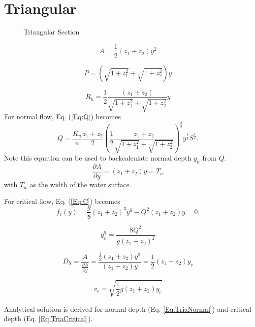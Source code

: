 \section{Triangular}

\begin{figure}[h]
\centering
{}
\caption{Triangular Section}
\end{figure}

\begin{equation}
A = \frac{1}{2} (z_1 + z_2) y^2
\end{equation}

\begin{equation}
P = \left(\sqrt{1+z_1^2} + \sqrt{1+z_2^2}\right)y
\end{equation}

\begin{equation}
R_h = \frac{1}{2}\frac{(z_1 + z_2) }{\sqrt{1+z_1^2} + \sqrt{1+z_2^2}}y
\end{equation}
For normal flow, Eq. (\ref{Eq:Q}) becomes
\begin{equation}
Q = \frac{K_u}{n} \frac{z_1 + z_2}{2}  \left(\frac{1}{2}\frac{z_1 + z_2}{\sqrt{1+z_1^2} + \sqrt{1+z_2^2}}\right)^{\frac{2}{3}} y^{\frac{8}{3}}S^{\frac{1}{2}}.
\label{Eq:TriaNormal}
\end{equation}
Note this equation can be used to backcalculate normal depth $y_n$ from $Q$.
\begin{equation}
\frac{\partial A}{\partial y} = (z_1 + z_2)y = T_w
\end{equation}
with $T_w$ as the width of the water surface.

\noindent For critical flow, Eq. (\ref{Eq:C}) becomes
\begin{equation}  
f_c(y)= \frac{g}{8}(z_1 + z_2)^3y^6 - Q^2(z_1 + z_2)y = 0.
\end{equation}

\begin{equation}  
y_c^5 = \frac{8Q^2}{g(z_1 + z_2)^2}
\label{Eq:TriaCritical}
\end{equation}

\begin{equation}  
D_h = \frac{A}{\frac{\partial A}{\partial y}} = \frac{\frac{1}{2} (z_1 + z_2) y^2}{(z_1 + z_2)y} = \frac{1}{2}(z_1 + z_2)y_c
\end{equation}

\begin{equation}  
v_c = \sqrt{\frac{1}{2}g(z_1 + z_2)y_c}
\end{equation}

\noindent Analytical solution is derived for normal depth (Eq. \ref{Eq:TriaNormal}) and critical depth (Eq. \ref{Eq:TriaCritical}).